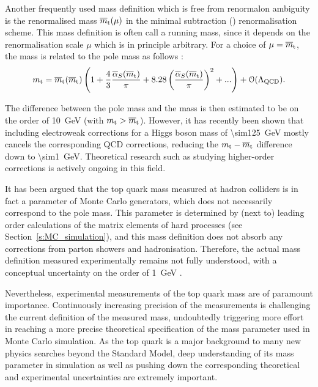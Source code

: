 Another frequently used mass definition which is free from renormalon ambiguity is the renormalised mass $\overline{m}_\mathrm{t}(\mu)$
in the minimal subtraction (\MS) renormalisation scheme. This mass definition is often call a running mass, since it
depends on the renormalisation scale $\mu$ which is in principle arbitrary. For a choice of $\mu=\overline{m}_\mathrm{t}$, the \MS mass
\MSmtop is related to the pole mass \mtop as follows \autocite{top_pole_mass}:
\begin{equation}
m_\mathrm{t} = \overline{m}_\mathrm{t}(\overline{m}_\mathrm{t}) \left( 1 + \frac{4}{3} \frac{\overline{\alpha}_S(\overline{m}_\mathrm{t})}{\pi} + 8.28
\left(\frac{\overline{\alpha}_S(\overline{m}_\mathrm{t})}{\pi} \right)^2 + ... \right) + \mathcal{O}(\Lambda_\textrm{QCD}).
\end{equation}

The difference between the pole mass and the \MS mass is then estimated to be on the order of \SI{10}{\GeV} (with $m_\mathrm{t}
> \overline{m}_\mathrm{t}$). However, it has recently been shown \autocite{pole_MS_top_difference} that including electroweak
corrections for a Higgs boson mass of \SI{\sim125}{\GeV} mostly cancels the corresponding QCD corrections, reducing the
$m_\mathrm{t}-\overline{m}_\mathrm{t}$ difference down to \SI{\sim1}{\GeV}. Theoretical research such as studying higher-order corrections is
actively ongoing in this field.

It has been argued that the top quark mass measured at hadron colliders is in fact a parameter of Monte Carlo
generators, which does not necessarily correspond to the pole mass. This parameter is determined by (next to) leading
order calculations of the matrix elements of hard processes (see Section~\ref{s:MC_simulation}), and this mass
definition does not absorb any corrections from parton showers and hadronisation. Therefore, the actual mass definition
measured experimentally remains not fully understood, with a conceptual uncertainty on the order of
\SI{1}{\GeV} \autocite{measured_top_mass_interpretation}.

Nevertheless, experimental measurements of the top quark mass are of paramount importance. Continuously increasing
precision of the measurements is challenging the current definition of the measured mass, undoubtedly triggering more
effort in reaching a more precise theoretical specification of the mass parameter used in Monte Carlo simulation. As the
top quark is a major background to many new physics searches beyond the Standard Model, deep understanding of its mass
parameter in simulation as well as pushing down the corresponding theoretical and experimental uncertainties are
extremely important.

